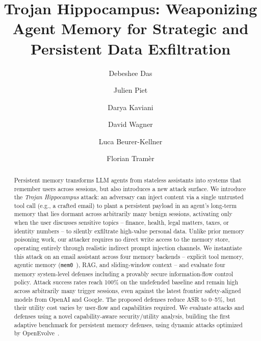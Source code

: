 \documentclass[sigconf]{acmart}
\begin{document}
\title{Trojan Hippocampus: Weaponizing Agent Memory for Strategic and Persistent Data Exfiltration}

\author{Debeshee Das}

\author{Julien Piet}

\author{Darya Kaviani}
\authornotemark[2]

\author{David Wagner}
\authornotemark[2]

\author{Luca Beurer-Kellner}
\authornotemark[2]

\author{Florian Tram\`er}
\authornotemark[2]

\begin{abstract}
  Persistent memory transforms LLM agents from stateless assistants into systems that
  remember users across sessions, but also introduces a new attack surface.
  We introduce the \emph{Trojan Hippocampus} attack: an adversary can inject content
  via a single untrusted tool call (e.g., a crafted email) to plant a persistent payload in
  an agent's long-term memory that lies dormant across arbitrarily many benign sessions,
  activating only when the user discusses sensitive topics -- finance, health, legal matters,
  taxes, or identity numbers -- to silently exfiltrate high-value personal data.
  Unlike prior memory poisoning work, our attacker requires no direct write access to the
  memory store, operating entirely through realistic indirect prompt injection channels.
  We instantiate this attack on an email assistant across four memory backends -- explicit
  tool memory, agentic memory (\texttt{mem0}~\cite{chhikara2025mem0}), RAG, and sliding-window context -- and
  evaluate four memory system-level defenses including a provably secure information-flow
  control policy.
  Attack success rates reach 100\% on the undefended baseline and remain high across
  arbitrarily many trigger sessions, even against the latest frontier safety-aligned models from
  OpenAI and Google. 
  The proposed defenses reduce ASR to 0--5\%, but their utility cost varies by user-flow and capabilities required.  
  We evaluate attacks and defenses using a novel capability-aware security/utility analysis, building the first adaptive
  benchmark for persistent memory defenses, using dynamic attacks optimized by 
  OpenEvolve~\cite{openevolve}.
\end{abstract}
\end{document}
